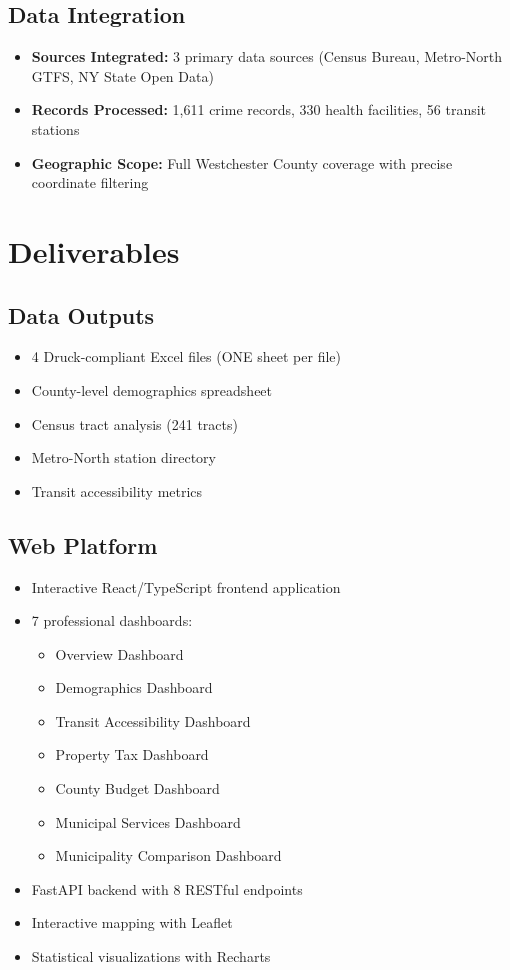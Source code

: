 \documentclass[11pt,letterpaper]{article}
\begin{document}
\subsection*{Data Integration}
\begin{itemize}
    \item \textbf{Sources Integrated:} 3 primary data sources (Census Bureau, Metro-North GTFS, NY State Open Data)
    \item \textbf{Records Processed:} 1,611 crime records, 330 health facilities, 56 transit stations
    \item \textbf{Geographic Scope:} Full Westchester County coverage with precise coordinate filtering
\end{itemize}

\section*{Deliverables}

\subsection*{Data Outputs}
\begin{itemize}
    \item 4 Druck-compliant Excel files (ONE sheet per file)
    \item County-level demographics spreadsheet
    \item Census tract analysis (241 tracts)
    \item Metro-North station directory
    \item Transit accessibility metrics
\end{itemize}

\subsection*{Web Platform}
\begin{itemize}
    \item Interactive React/TypeScript frontend application
    \item 7 professional dashboards:
    \begin{itemize}
        \item Overview Dashboard
        \item Demographics Dashboard
        \item Transit Accessibility Dashboard
        \item Property Tax Dashboard
        \item County Budget Dashboard
        \item Municipal Services Dashboard
        \item Municipality Comparison Dashboard
    \end{itemize}
    \item FastAPI backend with 8 RESTful endpoints
    \item Interactive mapping with Leaflet
    \item Statistical visualizations with Recharts
\end{itemize}
\end{document}
